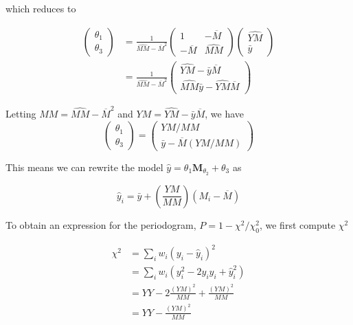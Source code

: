 \documentclass{aastex62}
\newcommand{\Mshft}{\mathbf{M}_{\theta_2}}
\newcommand{\MMhat}{\widehat{MM}}
\newcommand{\YMhat}{\widehat{YM}}
\newcommand{\Mbar}{\overline{M}}
\begin{document}
which reduces to

\begin{align}
\begin{pmatrix} \theta_1 \\ \theta_3 \end{pmatrix}
&=
\frac{1}{\MMhat - \Mbar^2}
\begin{pmatrix} 1 & -\Mbar \\ -\Mbar & \MMhat \end{pmatrix}
\begin{pmatrix} \YMhat \\ \bar{y}\end{pmatrix}\\
&=
\frac{1}{\MMhat - \Mbar^2}
\begin{pmatrix} \YMhat - \bar{y}\Mbar \\ \MMhat\bar{y} - \YMhat\Mbar \end{pmatrix}
\end{align}

Letting $MM = \MMhat - \Mbar^2$ and $YM = \YMhat - \bar{y}\Mbar$, we have
\begin{equation}
\begin{pmatrix} \theta_1 \\ \theta_3 \end{pmatrix}
=
\begin{pmatrix} YM / MM \\ \bar{y} - \Mbar (YM / MM)\end{pmatrix}
\end{equation}

This means we can rewrite the model $\hat{y} = \theta_1\Mshft + \theta_3$ as

\begin{equation}
\hat{y}_i = \bar{y} + \left(\frac{YM}{MM}\right)(M_i - \Mbar)
\end{equation}

To obtain an expression for the periodogram, $P = 1 - \chi^2 / \chi^2_0$, we first compute $\chi^2$

\begin{align}
\chi^2 &= \sum_i w_i (y_i - \hat{y}_i)^2 \\
       &= \sum_i w_i (y_i^2 - 2y_i\hat{y}_i + \hat{y}_i^2)\\
       &= YY - 2\frac{(YM)^2}{MM} + \frac{(YM)^2}{MM}\\
       &= YY - \frac{(YM)^2}{MM}
\end{align}
\end{document}
